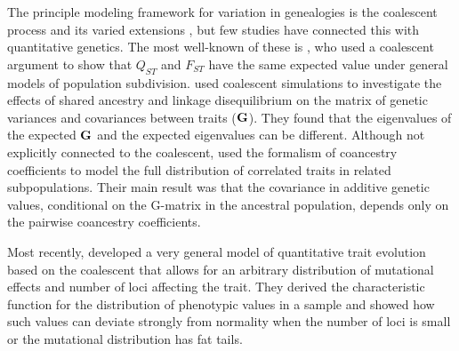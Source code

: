 \documentclass{article}
\begin{document}

The principle modeling framework for variation in genealogies is the coalescent
process and its varied extensions \citep{Wakeley2008}, but few studies have
connected this with quantitative genetics. The most well-known of these is
\citet{Whitlock1999}, who used a coalescent argument to show that $Q_{ST}$ and
$F_{ST}$ have the same expected value under general models of population
subdivision. \citet{Griswold2007} used coalescent simulations to investigate the
effects of shared ancestry and linkage disequilibrium on the matrix of genetic
variances and covariances between traits ($\mbox{\textbf{G}}$). They found that
the eigenvalues of the expected $\mbox{\textbf{G}}$ and the expected eigenvalues
can be different. Although not explicitly connected to the coalescent,
\citet{Ovaskainen2011} used the formalism of coancestry coefficients to model
the full distribution of correlated traits in related subpopulations. Their main
result was that the covariance in additive genetic values, conditional on the
G-matrix in the ancestral population, depends only on the pairwise coancestry
coefficients.

Most recently, \citet{Schraiber2015} developed a very general model of
quantitative trait evolution based on the coalescent that allows for an
arbitrary distribution of mutational effects and number of loci affecting the
trait. They derived the characteristic function for the distribution of
phenotypic values in a sample and showed how such values can deviate strongly
from normality when the number of loci is small or the mutational distribution
has fat tails.
\end{document}
